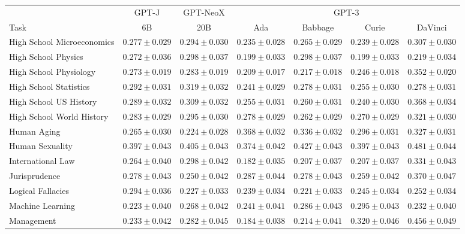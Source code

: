 \documentclass[11pt]{article}
\begin{document}
{\begin{landscape}
\begin{table}    
\centering 
\begin{tabular}{l c c c c c c }
 & GPT-J & GPT-NeoX & \multicolumn{4}{c}{GPT-3} \\
Task & 6B & 20B & Ada & Babbage & Curie & DaVinci\\ \toprule
High School Microeconomics & $0.277 \pm 0.029$ & $0.294 \pm 0.030$ & $0.235 \pm 0.028$ & $0.265 \pm 0.029$ & $0.239 \pm 0.028$ & $0.307 \pm 0.030$ \\ 
High School Physics & $0.272 \pm 0.036$ & $0.298 \pm 0.037$ & $0.199 \pm 0.033$ & $0.298 \pm 0.037$ & $0.199 \pm 0.033$ & $0.219 \pm 0.034$ \\ 
High School Physiology & $0.273 \pm 0.019$ & $0.283 \pm 0.019$ & $0.209 \pm 0.017$ & $0.217 \pm 0.018$ & $0.246 \pm 0.018$ & $0.352 \pm 0.020$ \\ 
High School Statistics & $0.292 \pm 0.031$ & $0.319 \pm 0.032$ & $0.241 \pm 0.029$ & $0.278 \pm 0.031$ & $0.255 \pm 0.030$ & $0.278 \pm 0.031$ \\ 
High School US History & $0.289 \pm 0.032$ & $0.309 \pm 0.032$ & $0.255 \pm 0.031$ & $0.260 \pm 0.031$ & $0.240 \pm 0.030$ & $0.368 \pm 0.034$ \\ 
High School World History & $0.283 \pm 0.029$ & $0.295 \pm 0.030$ & $0.278 \pm 0.029$ & $0.262 \pm 0.029$ & $0.270 \pm 0.029$ & $0.321 \pm 0.030$ \\ 
Human Aging & $0.265 \pm 0.030$ & $0.224 \pm 0.028$ & $0.368 \pm 0.032$ & $0.336 \pm 0.032$ & $0.296 \pm 0.031$ & $0.327 \pm 0.031$ \\ 
Human Sexuality & $0.397 \pm 0.043$ & $0.405 \pm 0.043$ & $0.374 \pm 0.042$ & $0.427 \pm 0.043$ & $0.397 \pm 0.043$ & $0.481 \pm 0.044$ \\ 
International Law & $0.264 \pm 0.040$ & $0.298 \pm 0.042$ & $0.182 \pm 0.035$ & $0.207 \pm 0.037$ & $0.207 \pm 0.037$ & $0.331 \pm 0.043$ \\ 
Jurisprudence & $0.278 \pm 0.043$ & $0.250 \pm 0.042$ & $0.287 \pm 0.044$ & $0.278 \pm 0.043$ & $0.259 \pm 0.042$ & $0.370 \pm 0.047$ \\ 
Logical Fallacies & $0.294 \pm 0.036$ & $0.227 \pm 0.033$ & $0.239 \pm 0.034$ & $0.221 \pm 0.033$ & $0.245 \pm 0.034$ & $0.252 \pm 0.034$ \\ 
Machine Learning & $0.223 \pm 0.040$ & $0.268 \pm 0.042$ & $0.241 \pm 0.041$ & $0.286 \pm 0.043$ & $0.295 \pm 0.043$ & $0.232 \pm 0.040$ \\ 
Management & $0.233 \pm 0.042$ & $0.282 \pm 0.045$ & $0.184 \pm 0.038$ & $0.214 \pm 0.041$ & $0.320 \pm 0.046$ & $0.456 \pm 0.049$ \\ 

\end{tabular}
\end{table}
\end{landscape}}
\end{document}
